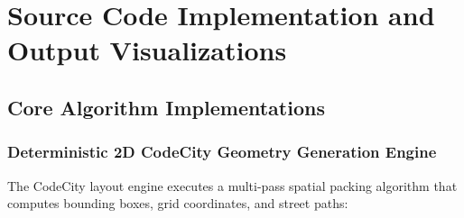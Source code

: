 \documentclass[11pt,a4paper,openany]{report}
\begin{document}
\chapter{Source Code Implementation and Output Visualizations}

\section{Core Algorithm Implementations}

\subsection{Deterministic 2D CodeCity Geometry Generation Engine}
The CodeCity layout engine executes a multi-pass spatial packing algorithm that computes bounding boxes, grid coordinates, and street paths:
\end{document}
